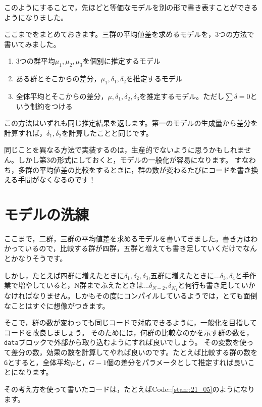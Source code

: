 \documentclass{ltjsbook}
\begin{document}
このようにすることで，先ほどと等価なモデルを別の形で書き表すことができるようになりました。

ここまでをまとめておきます。三群の平均値差を求めるモデルを，3つの方法で書いてみました。
\begin{enumerate}
  \item 3つの群平均$\mu_1,\mu_2,\mu_3$を個別に推定するモデル
  \item ある群とそこからの差分，$\mu_1,\delta_1,\delta_2$を推定するモデル
  \item 全体平均とそこからの差分，$\mu,\delta_1,\delta_2,\delta_3$を推定するモデル。ただし$\sum \delta = 0$という制約をつける
\end{enumerate}
この方法はいずれも同じ推定結果を返します。第一のモデルの生成量から差分を計算すれば，$\delta_1,\delta_2$を計算したことと同じです。

同じことを異なる方法で実装するのは，生産的でないように思うかもしれません。しかし第3の形式にしておくと，モデルの一般化が容易になります。
すなわち，多群の平均値差の比較をするときに，群の数が変わるたびにコードを書き換える手間がなくなるのです！
\section{モデルの洗練}
ここまで，二群，三群の平均値差を求めるモデルを書いてきました。書き方はわかっているので，比較する群が四群，五群と増えても書き足していくだけでなんとかなりそうです。

しかし，たとえば四群に増えたときに$\delta_1,\delta_2,\delta_3$,五群に増えたときに$...\delta_3,\delta_4$と手作業で増やしていると，N群までふえたときは$...\delta_{N-2},\delta_{N_1}$と何行も書き足していかなければなりません。しかもその度にコンパイルしているようでは，とても面倒なことはすぐに想像がつきます。

そこで，群の数が変わっても同じコードで対応できるように，一般化を目指してコードを改良しましょう。
そのためには，何群の比較なのかを示す群の数を，\verb|data|ブロックで外部から取り込むようにすれば良いでしょう。
その変数を使って差分の数，効果の数を計算してやれば良いのです。たとえば比較する群の数を\verb|G|とすると，全体平均$\mu$と，$G-1$個の差分をパラメータとして推定すれば良いことになります。

その考え方を使って書いたコードは，たとえばCode::\ref{stan::21_05}のようになります。
\end{document}
